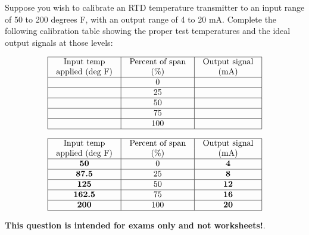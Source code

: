 

Suppose you wish to calibrate an RTD temperature transmitter to an input range of 50 to 200 degrees F, with an output range of 4 to 20 mA.  Complete the following calibration table showing the proper test temperatures and the ideal output signals at those levels:


$$\vbox{\offinterlineskip
\halign{\strut
\vrule \quad\hfil # \ \hfil & 
\vrule \quad\hfil # \ \hfil & 
\vrule \quad\hfil # \ \hfil \vrule \cr
\noalign{\hrule}
%
Input temp & Percent of span & Output signal \cr
%
applied (deg F) & (\%) & (mA) \cr
%
\noalign{\hrule}
%
 & 0 &  \cr
%
\noalign{\hrule}
%
 & 25 &  \cr
%
\noalign{\hrule}
%
 & 50 &  \cr
%
\noalign{\hrule}
%
 & 75 &  \cr
%
\noalign{\hrule}
%
 & 100 &  \cr
%
\noalign{\hrule}
} %
}$$ %








$$\vbox{\offinterlineskip
\halign{\strut
\vrule \quad\hfil # \ \hfil & 
\vrule \quad\hfil # \ \hfil & 
\vrule \quad\hfil # \ \hfil \vrule \cr
\noalign{\hrule}
%
Input temp & Percent of span & Output signal \cr
%
applied (deg F) & (\%) & (mA) \cr
%
\noalign{\hrule}
%
{\bf 50} & 0 & {\bf 4} \cr
%
\noalign{\hrule}
%
{\bf 87.5} & 25 & {\bf 8} \cr
%
\noalign{\hrule}
%
{\bf 125} & 50 & {\bf 12} \cr
%
\noalign{\hrule}
%
{\bf 162.5} & 75 & {\bf 16} \cr
%
\noalign{\hrule}
%
{\bf 200} & 100 & {\bf 20} \cr
%
\noalign{\hrule}
} %
}$$ %







{\bf This question is intended for exams only and not worksheets!}.




